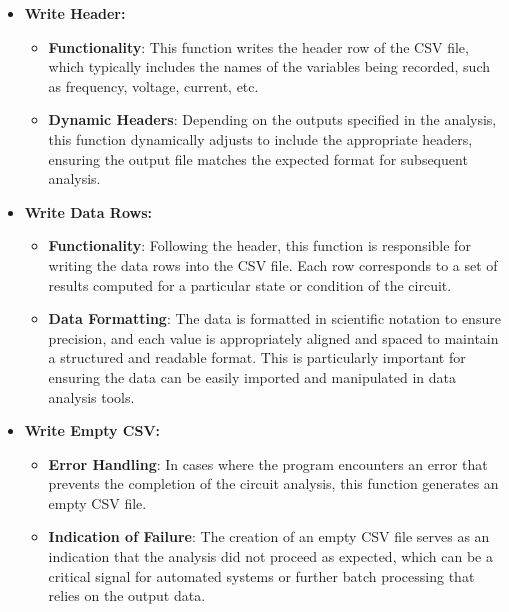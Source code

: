 \documentclass[conference]{IEEEtran}
\begin{document}
\begin{itemize}
  \item \textbf{Write Header:}
        \begin{itemize}
          \item \textbf{Functionality}: This function writes the header row of the CSV file, which typically includes the names of the 
          variables being recorded, such as frequency, voltage, current, etc.
          \item \textbf{Dynamic Headers}: Depending on the outputs specified in the analysis, this function dynamically adjusts to include 
          the appropriate headers, ensuring the output file matches the expected format for subsequent analysis.
        \end{itemize}

  \item \textbf{Write Data Rows:}
        \begin{itemize}
          \item \textbf{Functionality}: Following the header, this function is responsible for writing the data rows into the CSV file. 
          Each row corresponds to a set of results computed for a particular state or condition of the circuit.
          \item \textbf{Data Formatting}: The data is formatted in scientific notation to ensure precision, and each value is appropriately 
          aligned and spaced to maintain a structured and readable format. This is particularly important for ensuring the data can be 
          easily imported and manipulated in data analysis tools.
        \end{itemize}

  \item \textbf{Write Empty CSV:}
        \begin{itemize}
          \item \textbf{Error Handling}: In cases where the program encounters an error that prevents the completion of the circuit 
          analysis, this function generates an empty CSV file.
          \item \textbf{Indication of Failure}: The creation of an empty CSV file serves as an indication that the analysis did not 
          proceed as expected, which can be a critical signal for automated systems or further batch processing that relies on the 
          output data.
        \end{itemize}


\end{itemize}
\end{document}
